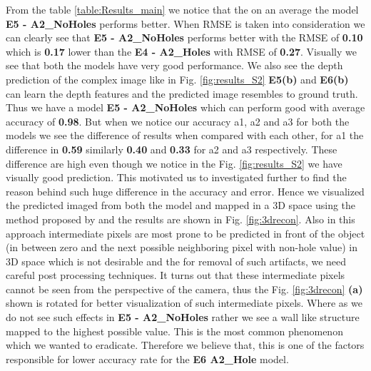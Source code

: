 From the table \ref{table:Results_main} we notice that the on an average the model \textbf{E5 - A2\_NoHoles} performs better. When RMSE is taken into consideration we can clearly see that \textbf{E5 - A2\_NoHoles} performs better with the RMSE of \textbf{0.10} which is \textbf{0.17} lower than the \textbf{E4 - A2\_Holes} with RMSE of \textbf{0.27}. Visually we see that both the models have very good performance. We also see the depth prediction of the complex image like in Fig. \ref{fig:results_S2} \textbf{E5(b)} and  \textbf{E6(b)} can learn the depth features and the predicted image resembles to ground truth. Thus we have a model \textbf{E5 - A2\_NoHoles} which can perform good with average accuracy of \textbf{0.98}. But when we notice our accuracy a1, a2 and a3 for both the models we see the difference of results when compared with each other, for a1 the difference in \textbf{0.59} similarly \textbf{0.40} and \textbf{0.33} for a2 and a3 respectively. These difference are high even though we notice in the Fig. \ref{fig:results_S2} we have visually good prediction. This motivated us to investigated further to find the reason behind such huge difference in the accuracy and error. Hence we visualized the predicted imaged from both the model and mapped in a 3D space using the method proposed by \cite{Zhou2018} and the results are shown in Fig. \ref{fig:3drecon}. Also in this approach intermediate pixels are most prone to be predicted in front of the object (in between zero and the next possible neighboring pixel with non-hole value) in 3D space which is not desirable and the for removal of such artifacts, we need careful post processing techniques. It turns out that these intermediate pixels cannot be seen from the perspective of the camera, thus the Fig. \ref{fig:3drecon} \textbf{(a)} shown is rotated for better visualization of such intermediate pixels. Where as we do not see such effects in \textbf{E5 - A2\_NoHoles} rather we see a wall like structure mapped to the highest possible value. This is the most common phenomenon which we wanted to eradicate. Therefore we believe that, this is one of the factors responsible for lower accuracy rate for the \textbf{E6 A2\_Hole} model. 

